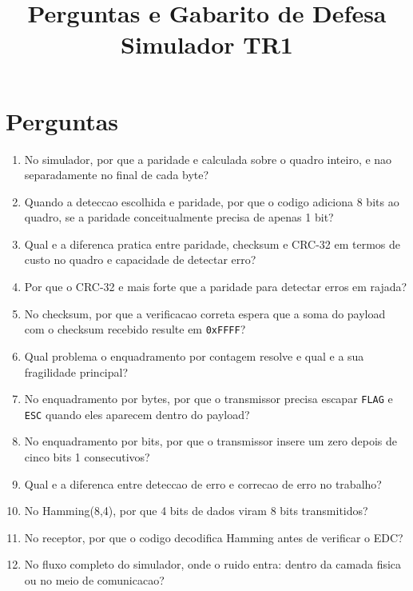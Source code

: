 \documentclass[12pt,a4paper]{article}
\title{Perguntas e Gabarito de Defesa \\ Simulador TR1}
\author{}
\date{}
\begin{document}
\maketitle

\section*{Perguntas}

\begin{enumerate}
  \item No simulador, por que a paridade e calculada sobre o quadro inteiro, e nao separadamente no final de cada byte?

  \item Quando a deteccao escolhida e paridade, por que o codigo adiciona 8 bits ao quadro, se a paridade conceitualmente precisa de apenas 1 bit?

  \item Qual e a diferenca pratica entre paridade, checksum e CRC-32 em termos de custo no quadro e capacidade de detectar erro?

  \item Por que o CRC-32 e mais forte que a paridade para detectar erros em rajada?

  \item No checksum, por que a verificacao correta espera que a soma do payload com o checksum recebido resulte em \texttt{0xFFFF}?

  \item Qual problema o enquadramento por contagem resolve e qual e a sua fragilidade principal?

  \item No enquadramento por bytes, por que o transmissor precisa escapar \texttt{FLAG} e \texttt{ESC} quando eles aparecem dentro do payload?

  \item No enquadramento por bits, por que o transmissor insere um zero depois de cinco bits 1 consecutivos?

  \item Qual e a diferenca entre deteccao de erro e correcao de erro no trabalho?

  \item No Hamming(8,4), por que 4 bits de dados viram 8 bits transmitidos?

  \item No receptor, por que o codigo decodifica Hamming antes de verificar o EDC?

  \item No fluxo completo do simulador, onde o ruido entra: dentro da camada fisica ou no meio de comunicacao?


\end{enumerate}
\end{document}
